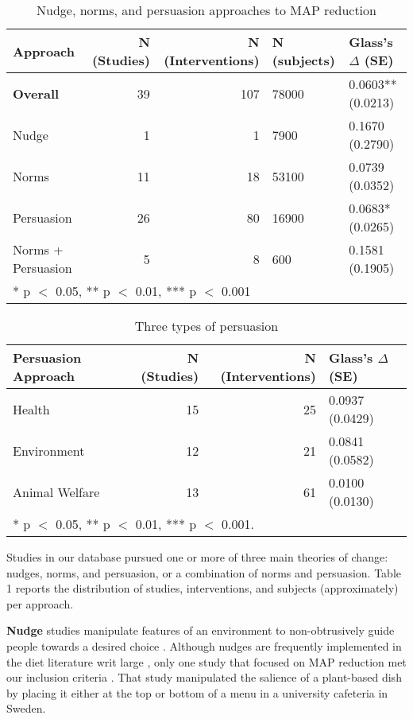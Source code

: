 \documentclass[sn-nature,pdflatex]{sn-jnl}
\begin{document}
\begin{table}[!h]
\centering
\caption{\label{tab:tab:table_one}Nudge, norms, and persuasion approaches to MAP reduction}
\centering
\begin{tabular}[t]{lrrll}
\toprule
Approach & N (Studies) & N (Interventions) & N (subjects) & Glass's $\Delta$ (SE)\\
\midrule
\textbf{Overall} & 39 & 107 & 78000 & 0.0603** (0.0213)\\
Nudge & 1 & 1 & 7900 & 0.1670 (0.2790)\\
Norms & 11 & 18 & 53100 & 0.0739 (0.0352)\\
Persuasion & 26 & 80 & 16900 & 0.0683* (0.0265)\\
Norms + Persuasion & 5 & 8 & 600 & 0.1581 (0.1905)\\
\bottomrule
\multicolumn{5}{l}{\rule{0pt}{1em}* p $<$ 0.05, ** p $<$ 0.01, *** p $<$ 0.001}\\
\end{tabular}
\end{table}

\begin{table}[!h]
\centering
\caption{\label{tab:tab:table_two}Three types of persuasion}
\centering
\begin{tabular}[t]{lrrl}
\toprule
Persuasion Approach & N (Studies) & N (Interventions) & Glass's $\Delta$ (SE)\\
\midrule
Health & 15 & 25 & 0.0937 (0.0429)\\
Environment & 12 & 21 & 0.0841 (0.0582)\\
Animal Welfare & 13 & 61 & 0.0100 (0.0130)\\
\bottomrule
\multicolumn{4}{l}{\rule{0pt}{1em}* p $<$ 0.05, ** p $<$ 0.01, *** p $<$ 0.001.}\\
\end{tabular}
\end{table}

Studies in our database pursued one or more of three main theories of
change: nudges, norms, and persuasion, or a combination of norms and
persuasion. Table 1 reports the distribution of studies, interventions,
and subjects (approximately) per approach.

\textbf{Nudge} studies manipulate features of an environment to
non-obtrusively guide people towards a desired choice
\citep{thaler2009}. Although nudges are frequently implemented in the
diet literature writ large
\citep{olafsson2024, cadario2020, szaszi2018}, only one study that
focused on MAP reduction met our inclusion criteria
\citep{andersson2021}. That study manipulated the salience of a
plant-based dish by placing it either at the top or bottom of a menu in
a university cafeteria in Sweden.
\end{document}
